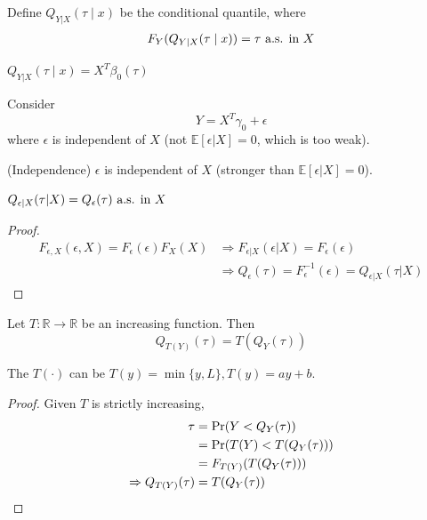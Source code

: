 \documentclass[11pt]{elegantbook}
\begin{document}
Define $Q_{Y|X}(\tau\mid x)$ be the conditional quantile, where
\begin{equation}
    \begin{aligned}
        F_Y(Q_{Y|X}(\tau\mid x))=\tau \textnormal{ a.s. in $X$}
    \end{aligned}
    \nonumber
\end{equation}

\begin{definition}
\normalfont
    $Q_{Y|X}(\tau\mid x)=X^T\beta_0(\tau)$
\end{definition}


Consider $$Y=X^T\gamma_0+\epsilon$$
where $\epsilon$ is independent of $X$ (not $\mathbb{E}[\epsilon|X]=0$, which is too weak).
\begin{assumption} (Independence)
    $\epsilon$ is independent of $X$ (stronger than $\mathbb{E}[\epsilon|X]=0$).
\end{assumption}
\begin{lemma}[By Independence]
    $Q_{\epsilon|X}(\tau|X)=Q_\epsilon(\tau) \textnormal{ a.s. in $X$}$
\end{lemma}
\begin{proof}
    \begin{equation}
        \begin{aligned}
            F_{\epsilon,X}(\epsilon,X)=F_{\epsilon}(\epsilon)F_X(X) &\Rightarrow F_{\epsilon|X}(\epsilon|X)=F_{\epsilon}(\epsilon)\\
            & \Rightarrow Q_{\epsilon}(\tau)=F^{-1}_\epsilon(\epsilon)=Q_{\epsilon|X}(\tau|X)
        \end{aligned}
        \nonumber
    \end{equation}
\end{proof}
\begin{lemma}\label{lemma:equivalence}
    Let $T: \mathbb{R} \rightarrow \mathbb{R}$ be an increasing function. Then $$Q_{T(Y)}(\tau)=T(Q_Y(\tau))$$
\end{lemma}
\begin{example}
    The $T(\cdot)$ can be $T(y)=\min\{y,L\}, T(y)=ay+b$.
\end{example}
\begin{proof}
    Given $T$ is strictly increasing,
    \begin{equation}
        \begin{aligned}
            \tau&=\textnormal{Pr}(Y<Q_Y(\tau))\\
            &=\textnormal{Pr}(T(Y)<T(Q_Y(\tau)))\\
            &=F_{T(Y)}(T(Q_Y(\tau)))\\
            \Rightarrow Q_{T(Y)}(\tau)&=T(Q_Y(\tau))
        \end{aligned}
        \nonumber
    \end{equation}
\end{proof}
\end{document}
